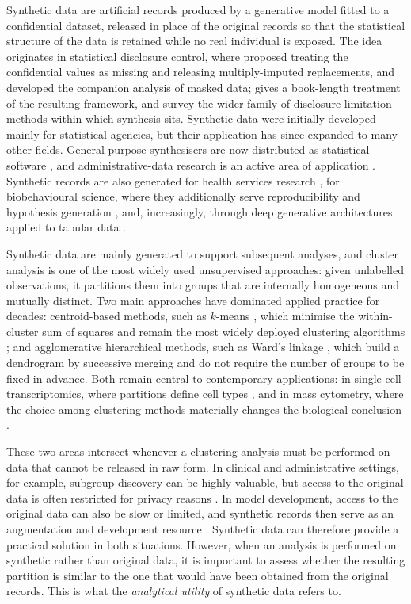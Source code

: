 \documentclass[pdflatex,sn-basic]{sn-jnl}
\begin{document}
Synthetic data are artificial records produced by a generative model fitted to
a confidential dataset, released in place of the original records so that the
statistical structure of the data is retained while no real individual is
exposed. The idea originates in statistical disclosure control, where
\citet{rubin1993} proposed treating the confidential values as missing and
releasing multiply-imputed replacements, and \citet{little1993} developed the
companion analysis of masked data; \citet{drechsler2011} gives a book-length
treatment of the resulting framework, and \citet{matthews2011} survey the wider
family of disclosure-limitation methods within which synthesis sits. Synthetic
data were initially developed mainly for statistical agencies, but their
application has since expanded to many other fields. General-purpose
synthesisers are now distributed as statistical software
\citep{nowok2016,templ2017}, and administrative-data research is an active
area of application \citep{kokosi2022}. Synthetic records are also generated
for health services research \citep{gonzales2023,giuffre2023}, for
biobehavioural science, where they additionally serve reproducibility and
hypothesis generation \citep{quintana2020}, and, increasingly, through deep
generative architectures applied to tabular data \citep{goyal2024,zhao2024}.

Synthetic data are mainly generated to support subsequent analyses, and cluster
analysis is one of the most widely used unsupervised approaches: given
unlabelled observations, it partitions them into groups that are internally
homogeneous and mutually distinct. Two main approaches have dominated applied
practice for decades: centroid-based methods, such as $k$-means
\citep{macqueen1967,steinley2006}, which minimise the within-cluster sum of
squares and remain the most widely deployed clustering algorithms
\citep{ahmed2020}; and agglomerative hierarchical methods, such as Ward's
linkage \citep{ward1963}, which build a dendrogram by successive merging and
do not require the number of groups to be fixed in advance. Both remain
central to contemporary applications: in single-cell transcriptomics, where
partitions define cell types \citep{zappia2018}, and in mass cytometry, where
the choice among clustering methods materially changes the biological
conclusion \citep{liu2019}.

These two areas intersect whenever a clustering analysis must be performed on
data that cannot be released in raw form. In clinical and administrative
settings, for example, subgroup discovery can be highly valuable, but access
to the original data is often restricted for privacy reasons
\citep{goncalves2020,elemam2020,bhanot2021}. In model development, access to
the original data can also be slow or limited, and synthetic records then
serve as an augmentation and development resource \citep{rankin2020}.
Synthetic data can therefore provide a practical solution in both situations.
However, when an analysis is performed on synthetic rather than original data,
it is important to assess whether the resulting partition is similar to the
one that would have been obtained from the original records. This is what the
\emph{analytical utility} of synthetic data refers to.
\end{document}
